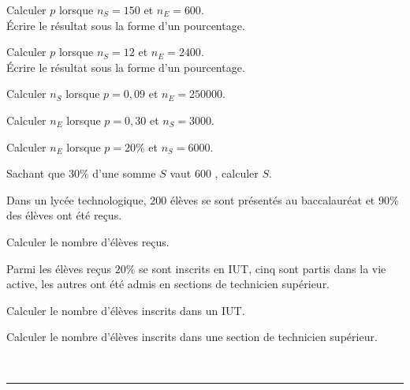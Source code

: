 \documentclass[a4paper,10pt]{book}        %
\begin{document}
\begin{minipage}[c]{0.48\linewidth}
	\begin{enumMet}
		\item Calculer $p$ lorsque $n_S = 150$ et $n_E = 600$.\\
		Écrire le résultat sous la forme d'un pourcentage.
		\item Calculer $p$ lorsque $n_S = 12$ et $n_E= 2 400$.\\
		Écrire le résultat sous la forme d'un pourcentage.
		\item Calculer $n_S$ lorsque $p = 0,09$ et $n_E= 250 000$.
		\item Calculer $n_E$ lorsque $p = 0,30$ et $n_S = 3 000$.
		\item Calculer $n_E$ lorsque $p = 20 \%$ et $n_S = 6 000$.
		\item Sachant que $30 \%$ d'une somme $S$ vaut $600$ \EUR{}, calculer $S$.
	\end{enumMet}
\end{minipage} \hfill
\begin{minipage}[c]{0.48\linewidth}
	\exercice{(Après le bac)}
	
	Dans un lycée technologique, $200$ élèves se sont présentés
	au baccalauréat et $90 \%$ des élèves ont été reçus.\\
	\begin{enumMet}
		\item Calculer le nombre d'élèves reçus.
		\item Parmi les élèves reçus $20 \%$ se sont inscrits en IUT, cinq sont partis dans la vie active, les autres ont été admis en sections de technicien supérieur.
		\begin{enumMet}
			\item Calculer le nombre d'élèves inscrits dans un IUT.\\
			\item Calculer le nombre d'élèves inscrits dans une section de technicien supérieur.
		\end{enumMet}
	\end{enumMet}
\end{minipage}

\ \\
\mbox{}\hfill\rule{0.8\linewidth}{1pt}\hfill\mbox{}
\end{document}
